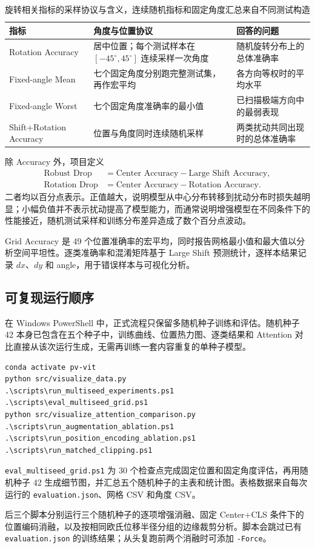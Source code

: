 \begin{table}[H]
  \centering
  \caption{旋转相关指标的采样协议与含义，连续随机指标和固定角度汇总来自不同测试构造}
  \label{tab:rotation-protocols}
  \begin{tabularx}{\textwidth}{>{\raggedright\arraybackslash}p{}>{\raggedright\arraybackslash}p{}X}
    \toprule
    指标 & 角度与位置协议 & 回答的问题 \\
    \midrule
    Rotation Accuracy & 居中位置；每个测试样本在 $[-45^\circ,45^\circ]$ 连续采样一次角度 & 随机旋转分布上的总体准确率 \\
    Fixed-angle Mean & 七个固定角度分别跑完整测试集，再作宏平均 & 各方向等权时的平均水平 \\
    Fixed-angle Worst & 七个固定角度准确率的最小值 & 已扫描极端方向中的最弱表现 \\
    Shift+Rotation Accuracy & 位置与角度同时连续随机采样 & 两类扰动共同出现时的总体准确率 \\
    \bottomrule
  \end{tabularx}
\end{table}

除 Accuracy 外，项目定义
\begin{align}
  \text{Robust Drop} &= \text{Center Accuracy}-\text{Large Shift Accuracy},\\
  \text{Rotation Drop} &= \text{Center Accuracy}-\text{Rotation Accuracy}.
\end{align}
二者均以百分点表示。正值越大，说明模型从中心分布转移到扰动分布时损失越明显；小幅负值并不表示扰动提高了模型能力，而通常说明增强模型在不同条件下的性能接近，随机测试采样和训练分布差异造成了数个百分点波动。

Grid Accuracy 是 49 个位置准确率的宏平均，同时报告网格最小值和最大值以分析空间平坦性。逐类准确率和混淆矩阵基于 Large Shift 预测统计，逐样本结果记录 $dx$、$dy$ 和 angle，用于错误样本与可视化分析。

\subsection{可复现运行顺序}

在 Windows PowerShell 中，正式流程只保留多随机种子训练和评估。随机种子 42 本身已包含在五个种子中，训练曲线、位置热力图、逐类结果和 Attention 对比直接从该次运行生成，无需再训练一套内容重复的单种子模型。

\begin{verbatim}
conda activate pv-vit
python src/visualize_data.py
.\scripts\run_multiseed_experiments.ps1
.\scripts\eval_multiseed_grid.ps1
python src/visualize_attention_comparison.py
.\scripts\run_augmentation_ablation.ps1
.\scripts\run_position_encoding_ablation.ps1
.\scripts\run_matched_clipping.ps1
\end{verbatim}

\texttt{eval\_multiseed\_grid.ps1} 为 30 个检查点完成固定位置和固定角度评估，再用随机种子 42 生成细节图，并汇总五个随机种子的主表和统计图。表格数据来自每次运行的 \texttt{evaluation.json}、网格 CSV 和角度 CSV。

后三个脚本分别运行三个随机种子的逐项增强消融、固定 Center+CLS 条件下的位置编码消融，以及按相同欧氏位移半径分组的边缘裁剪分析。脚本会跳过已有 \texttt{evaluation.json} 的训练结果；从头复跑前两个消融时可添加 \texttt{-Force}。
